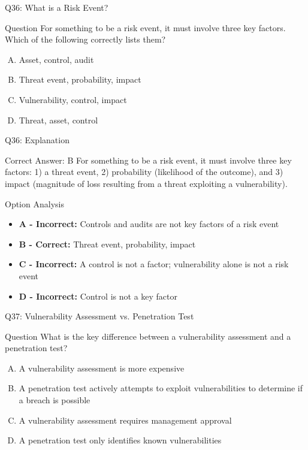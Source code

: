 \documentclass{beamer}
\begin{document}
	\begin{frame}{Q36: What is a Risk Event?}
		\begin{block}{Question}
			For something to be a risk event, it must involve three key factors. Which of the following correctly lists them?
		\end{block}
		\begin{enumerate}[(A)]
			\item Asset, control, audit
			\item Threat event, probability, impact
			\item Vulnerability, control, impact
			\item Threat, asset, control
		\end{enumerate}
	\end{frame}
	
	\begin{frame}{Q36: Explanation}
		\begin{block}{Correct Answer: B}
			For something to be a risk event, it must involve three key factors: 1) a threat event, 2) probability (likelihood of the outcome), and 3) impact (magnitude of loss resulting from a threat exploiting a vulnerability).
		\end{block}
		\begin{block}{Option Analysis}
			\begin{itemize}
				\item \textbf{A - Incorrect:} Controls and audits are not key factors of a risk event
				\item \textbf{B - Correct:} Threat event, probability, impact
				\item \textbf{C - Incorrect:} A control is not a factor; vulnerability alone is not a risk event
				\item \textbf{D - Incorrect:} Control is not a key factor
			\end{itemize}
		\end{block}
	\end{frame}
	
	\begin{frame}{Q37: Vulnerability Assessment vs. Penetration Test}
		\begin{block}{Question}
			What is the key difference between a vulnerability assessment and a penetration test?
		\end{block}
		\begin{enumerate}[(A)]
			\item A vulnerability assessment is more expensive
			\item A penetration test actively attempts to exploit vulnerabilities to determine if a breach is possible
			\item A vulnerability assessment requires management approval
			\item A penetration test only identifies known vulnerabilities
		\end{enumerate}
	\end{frame}
	
\end{document}
